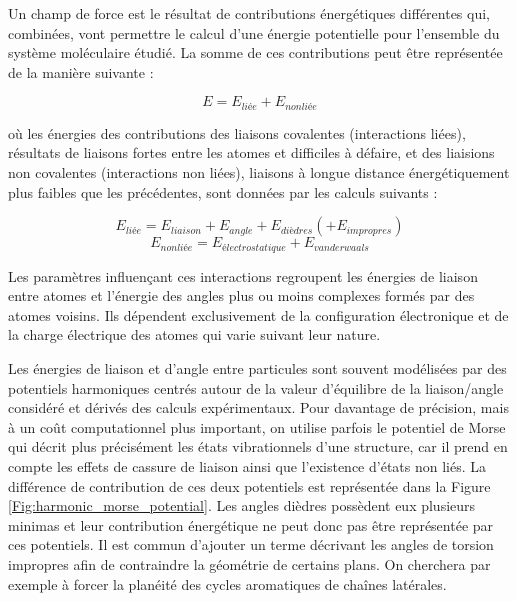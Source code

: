 Un champ de force est le résultat de contributions énergétiques différentes qui, combinées, vont permettre le calcul d'une énergie potentielle pour l'ensemble du système moléculaire étudié. La somme de ces contributions peut être représentée de la manière suivante :

$$E = E_{liée} + E_{nonliée}$$

où les énergies des contributions des liaisons covalentes (interactions liées), résultats de liaisons fortes entre les atomes et difficiles à défaire, et des liaisions non covalentes (interactions non liées), liaisons à longue distance énergétiquement plus faibles que les précédentes, sont données par les calculs suivants :

$$E_{liée} = E_{liaison} + E_{angle} + E_{dièdres} (+ E_{impropres})$$
$$E_{nonliée} = E_{électrostatique} + E_{vanderwaals}$$

Les paramètres influençant ces interactions regroupent les énergies de liaison entre atomes et l'énergie des angles plus ou moins complexes formés par des atomes voisins. Ils dépendent exclusivement de la configuration électronique et de la charge électrique des atomes qui varie suivant leur nature.


Les énergies de liaison et d'angle entre particules sont souvent modélisées par des potentiels harmoniques centrés autour de la valeur d'équilibre de la liaison/angle considéré et dérivés des calculs expérimentaux. Pour davantage de précision, mais à un coût computationnel plus important, on utilise parfois le potentiel de Morse qui décrit plus précisément les états vibrationnels d'une structure, car il prend en compte les effets de cassure de liaison ainsi que l'existence d'états non liés. La différence de contribution de ces deux potentiels est représentée dans la Figure \ref{Fig:harmonic_morse_potential}. Les angles dièdres possèdent eux plusieurs minimas et leur contribution énergétique ne peut donc pas être représentée par ces potentiels. Il est commun d'ajouter un terme décrivant les angles de torsion impropres afin de contraindre la géométrie de certains plans. On cherchera par exemple à forcer la planéité des cycles aromatiques de chaînes latérales.

